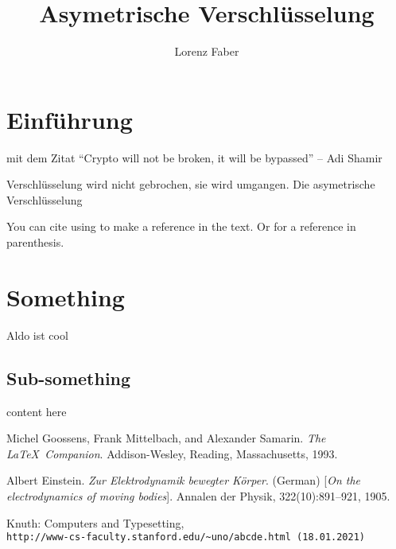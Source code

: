\documentclass[a4paper, 12pt, one column]{article}
\title{Asymetrische Verschlüsselung}
\author{Lorenz Faber}
\begin{document}
	\maketitle
	
	
	\section{Einführung}
	
	mit dem Zitat 
	“Crypto will not be broken, it will be bypassed”
	– Adi Shamir
	
	Verschlüsselung wird nicht gebrochen, sie wird umgangen.
	Die asymetrische Verschlüsselung
	
	You can cite using to make a reference in the text. Or for a reference in parenthesis. \cite{latexcompanion,knuthwebsite}
	
	\section{Something}
	
	Aldo ist cool
	
	\subsection{Sub-something}
	
	content here
	
	
	\medskip
	
	\begin{thebibliography}{9}
		Michel Goossens, Frank Mittelbach, and Alexander Samarin. 
		\textit{The \LaTeX\ Companion}. 
		Addison-Wesley, Reading, Massachusetts, 1993.
		
		Albert Einstein. 
		\textit{Zur Elektrodynamik bewegter K{\"o}rper}. (German) 
		[\textit{On the electrodynamics of moving bodies}]. 
		Annalen der Physik, 322(10):891–921, 1905.
		
		Knuth: Computers and Typesetting,
		\\\texttt{http://www-cs-faculty.stanford.edu/\~{}uno/abcde.html (18.01.2021)}
	\end{thebibliography}
\end{document}
